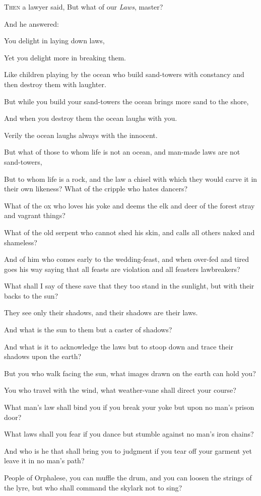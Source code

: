 \lettrine{T}{hen} a lawyer said, But what of our
\textit{Laws}, master?

\medskip
And he answered:

You delight in laying down laws,

Yet you delight more in breaking them.

Like children playing by the ocean who
build sand-towers with constancy and
then destroy them with laughter.

But while you build your sand-towers the
ocean brings more sand to the shore,

And when you destroy them the ocean
laughs with you.

Verily the ocean laughs always with the
innocent.

But what of those to whom life is not
an ocean, and man-made laws are not
sand-towers,

But to whom life is a rock, and the law
a chisel with which they would carve it
in their own likeness? What of the
cripple who hates dancers?

What of the ox who loves his yoke and
deems the elk and deer of the forest
stray and vagrant things?

What of the old serpent who cannot shed
his skin, and calls all others naked and
shameless?

And of him who comes early to the
wedding-feast, and when over-fed and
tired goes his way saying that all
feasts are violation and all feasters
lawbreakers?



What shall I say of these save that
they too stand in the sunlight, but with
their backs to the sun?

They see only their shadows, and their
shadows are their laws.

And what is the sun to them but a caster
of shadows?

And what is it to acknowledge the
laws but to stoop down and trace their
shadows upon the earth?

But you who walk facing the sun, what
images drawn on the earth can hold
you?

You who travel with the wind, what
weather-vane shall direct your course?

What man’s law shall bind you if you
break your yoke but upon no man’s prison
door?

What laws shall you fear if you dance
but stumble against no man’s iron
chains?

And who is he that shall bring you to
judgment if you tear off your garment
yet leave it in no man’s path?



People of Orphalese, you can muffle the
drum, and you can loosen the strings
of the lyre, but who shall command the
skylark not to sing?
